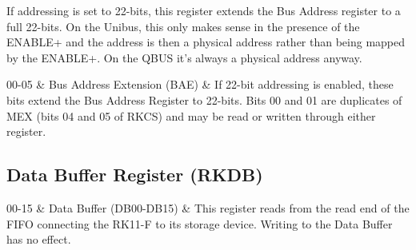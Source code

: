 If addressing is set to 22-bits, this register extends the Bus
Address register to a full 22-bits.  On the Unibus, this only makes
sense in the presence of the ENABLE+ and the address is then a
physical address rather than being mapped by the ENABLE+.  On the QBUS
it's always a physical address anyway.

\begin{register16}
\end{register16}

\begin{bittable}
  00-05 & Bus Address Extension (BAE) & If 22-bit addressing is
  enabled, these bits extend the Bus Address Register to 22-bits.
  Bits 00 and 01 are duplicates of MEX (bits 04 and 05 of RKCS) and
  may be read or written through either register. \\
\end{bittable}


\subsection{Data Buffer Register (RKDB)}

\begin{register16}
\end{register16}

\begin{bittable}
  00-15 & Data Buffer (DB00-DB15) & This register reads from the read
  end of the FIFO connecting the RK11-F to its storage device.
  Writing to the Data Buffer has no effect. \\
\end{bittable}

